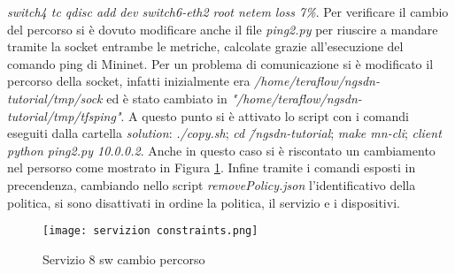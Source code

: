 \textit{switch4 tc qdisc add dev switch6-eth2 root netem loss 7\%}.
Per verificare il cambio del percorso si è dovuto modificare anche il file \textit{ping2.py} per riuscire a mandare tramite la socket
entrambe le metriche, calcolate grazie all'esecuzione del comando ping di Mininet. 
Per un problema di comunicazione si è modificato il percorso della socket, infatti inizialmente era \textit{/home/teraflow/ngsdn-tutorial/tmp/sock} ed
è stato cambiato in \textit{"/home/teraflow/ngsdn-tutorial/tmp/tfsping"}.
A questo punto si è attivato lo script con
i comandi eseguiti dalla cartella \textit{solution}: \textit{./copy.sh};
\textit{cd \~/ngsdn-tutorial}; \textit{make mn-cli}; \textit{client python ping2.py 10.0.0.2}.
Anche in questo caso si è riscontato un cambiamento nel persorso come mostrato in Figura \ref{fig:sw8 dopo}.
Infine tramite i comandi esposti in precendenza, cambiando nello script \textit{removePolicy.json} l'identificativo della politica, si sono disattivati in ordine la politica, il servizio e i dispositivi.
\begin{figure}[h]
    \centering
   \texttt{[image: servizion constraints.png]}
    \caption{Servizio 8 sw cambio percorso}
    \label{fig:sw8 dopo}
\end{figure}

